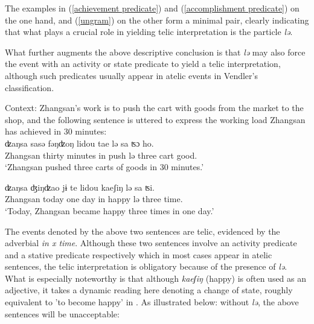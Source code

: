 \documentclass[output=paper]{langsci/langscibook}
\begin{document}
The examples in (\ref{achievement predicate}) and (\ref{accomplishment
predicate}) on the one hand, and (\ref{ungram}) on the other form a minimal
pair, clearly indicating that what plays a crucial role in yielding telic
interpretation is the particle \emph{lə}.

What further augments the above descriptive conclusion is that \emph{lə} may
also force the event with an activity or state predicate to yield a telic
interpretation, although such predicates usually appear in atelic events in
Vendler's classification.

\begin{exe}
\ex {} \begin{xlist}
    \ex\label{coerced telic}
    Context: Zhangsan's work is to push the cart with goods from the market to
    the shop, and the following sentence is uttered to express the working load
    Zhangsan has achieved in 30 minutes:\\
    \gll ʣaŋsa {sasə} {fəŋʣoŋ} lidou tae {lə} sa {ʦɔ} ho. \\
    Zhangsan thirty minutes in push {lə} three cart good. \\
    \glt \enquote*{Zhangsan pushed three carts of goods in 30 minutes.}

    \ex \gll ʣaŋsa ʤiŋʣao {jɨ} te lidou {kaeʃiŋ} {lə} sa {ʦi}. \\
    Zhangsan today one day in happy {lə} three time. \\
    \glt \enquote*{Today, Zhangsan became happy three times in one day.}
\end{xlist}
\end{exe}

The events denoted by the above two sentences are telic, evidenced by the
adverbial \emph{in x time}. Although these two sentences involve an activity
predicate and a stative predicate respectively which in most cases appear in
atelic sentences, the telic interpretation is obligatory because of the
presence of \emph{lə}. What is especially noteworthy is that although
\emph{kaeʃiŋ} (happy) is often used as an adjective, it takes a dynamic reading
here denoting a change of state, roughly equivalent to 'to become happy' in
. As illustrated below: without \emph{lə}, the above sentences
will be unacceptable:
\end{document}
